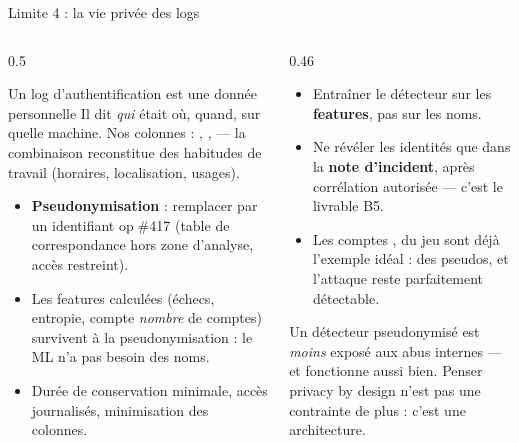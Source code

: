 \begin{frame}{Limite 4 : la vie privée des logs}
\begin{columns}[t]
\begin{column}{0.5\textwidth}
\begin{block}{Un log d'authentification est une donnée personnelle}
Il dit \emph{qui} était où, quand, sur quelle machine. Nos colonnes :
, ,  --- la combinaison reconstitue
des habitudes de travail (horaires, localisation, usages).
\end{block}
\begin{itemize}
\item \textbf{Pseudonymisation} : remplacer  par un identifiant
op$\;$\#417 (table de correspondance hors zone d'analyse, accès restreint).
\item Les features calculées (échecs, entropie, compte \emph{nombre} de
comptes) survivent à la pseudonymisation : le ML n'a pas besoin des noms.
\item Durée de conservation minimale, accès journalisés, minimisation des
colonnes.
\end{itemize}
\end{column}
\begin{column}{0.46\textwidth}
\begin{ebox}
\begin{itemize}
\item Entraîner le détecteur sur les \textbf{features}, pas sur les noms.
\item Ne révéler les identités que dans la \textbf{note d'incident}, après
corrélation autorisée --- c'est le livrable B5.
\item Les comptes ,  du jeu sont déjà l'exemple
idéal : des pseudos, et l'attaque reste parfaitement détectable.
\end{itemize}
\end{ebox}
\begin{kbox}
Un détecteur pseudonymisé est \emph{moins} exposé aux abus internes ---
et fonctionne aussi bien. Penser privacy by design n'est pas une contrainte
de plus : c'est une architecture.
\end{kbox}
\end{column}
\end{columns}
\end{frame}
